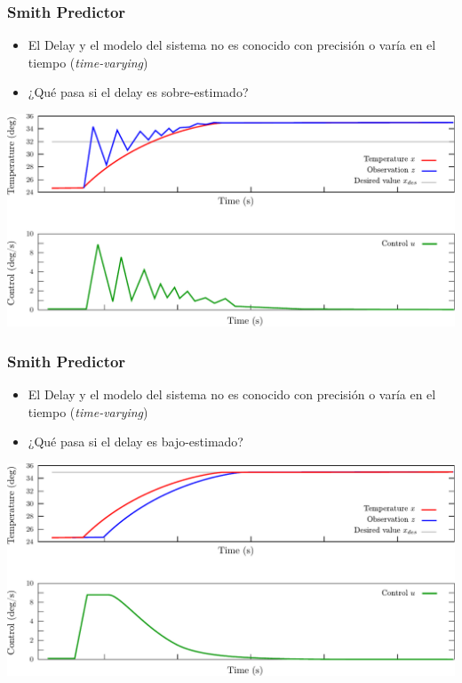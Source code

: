 \begin{frame}
    \frametitle{Smith Predictor}
    
    \begin{itemize}
        \item El Delay y el modelo del sistema no es conocido con precisión o varía en el tiempo (\emph{time-varying})
        \item ¿Qué pasa si el delay es sobre-estimado?
    \end{itemize}
    
    \begin{center}
        \includegraphics[width=0.8\columnwidth]{images/pid_control_proportional_smith_predictor_overestimated.pdf}
    \end{center}
    
\end{frame}

\begin{frame}
    \frametitle{Smith Predictor}
    
    \begin{itemize}
        \item El Delay y el modelo del sistema no es conocido con precisión o varía en el tiempo (\emph{time-varying})
        \item ¿Qué pasa si el delay es bajo-estimado?
    \end{itemize}
    
    \begin{center}
        \includegraphics[width=0.8\columnwidth]{images/pid_control_proportional_smith_predictor_underestimated.pdf}
    \end{center}
    
\end{frame}